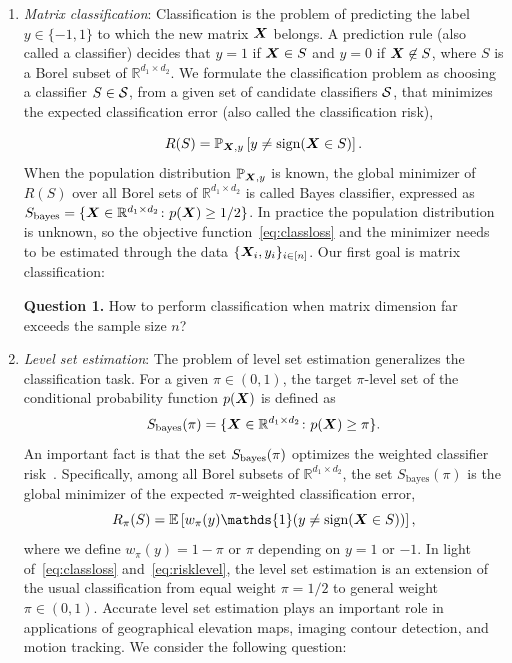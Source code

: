 \documentclass[11pt]{article}
\theoremstyle{definition}
\def\sign{\textup{sign}}
\def\bayesS{S_{\textup{bayes}}}
\begin{document}
\begin{enumerate}[label={2.\arabic*},wide, labelwidth=!, labelindent=0pt]
\item {\it Matrix classification}: Classification is the problem of predicting the label $y\in \{-1,1\}$ to which the new matrix $\bm X$ belongs. A prediction rule (also called a classifier) decides that $y=1$ if $\bm X\in S$ and $y=0$ if $\bm X \not\in S$, where $S$ is a Borel subset of $\mathbb{R}^{d_1\times d_2}$. We formulate the classification problem as choosing a classifier $S\in \mathcal{S}$, from a given set of candidate classifiers $\mathcal{S}$, that minimizes the expected classification error (also called the classification risk), 

\begin{equation}\label{eq:classloss}
R(S)=\mathbb{P}_{\mX,y}\left[y\neq \sign(\mX\in S)\right].
\end{equation}
When the population distribution $\mathbb{P}_{\bm X,y}$ is known, the global minimizer of $R(S)$ over all Borel sets of $\mathbb{R}^{d_1\times d_2}$ is called Bayes classifier, expressed as $\bayesS=\{\mX\in\mathbb{R}^{d_1\times d_2}\colon p(\mX)\geq 1/2\}$. In practice the population distribution is unknown, so the objective function~\eqref{eq:classloss} and the minimizer needs to be estimated through the data $\{\bm X_i,y_i\}_{i\in[n]}$. Our first goal is matrix classification:

{\bf Question 1.} How to perform classification when matrix dimension far exceeds the sample size $n$?

\item {\it Level set estimation}: The problem of level set estimation generalizes the classification task. For a given $\pi\in(0, 1)$, the target $\pi$-level set of the conditional probability function $p(\bm X)$ is defined as
\begin{equation}\label{eq:level}
\bayesS(\pi) = \{\mX\in\mathbb{R}^{d_1\times d_2}\colon p(\mX)\geq \pi\}.
\end{equation}
An important fact is that the set $\bayesS(\pi)$ optimizes the weighted classifier risk~\citep{willett2007minimax,scott2007regression,wang2008probability}. Specifically, among all Borel subsets of $\mathbb{R}^{d_1\times d_2}$, the set $S_{\text{bayes}}(\pi)$ is the global minimizer of the expected $\pi$-weighted classification error,
\begin{equation}\label{eq:risklevel}
R_\pi(S)=\mathbb{E}\left[ w_{\pi}(y)\mathds{1}(y\neq \sign(\mX\in S))\right],
\end{equation}
where we define $w_{\pi}(y)=1-\pi$ or $\pi$ depending on $y=1$ or $-1$. In light of~\eqref{eq:classloss} and~\eqref{eq:risklevel}, the level set estimation is an extension of the usual classification from equal weight $\pi=1/2$ to general weight $\pi \in(0,1)$. Accurate level set estimation plays an important role in applications of geographical elevation maps, imaging contour detection, and motion tracking. We consider the following question:


\end{enumerate}
\end{document}
